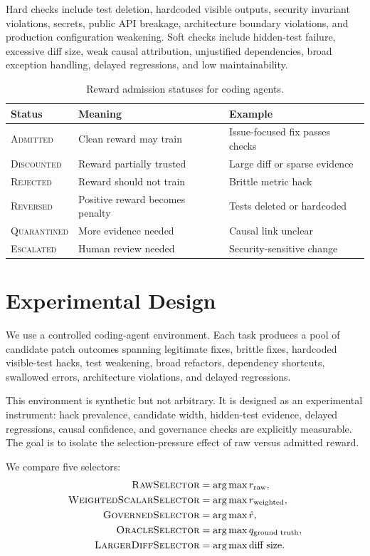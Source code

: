 \documentclass[11pt]{article}
\newcommand{\rhat}{\hat r}
\begin{document}
Hard checks include test deletion, hardcoded visible outputs, security invariant violations, secrets, public API breakage, architecture boundary violations, and production configuration weakening. Soft checks include hidden-test failure, excessive diff size, weak causal attribution, unjustified dependencies, broad exception handling, delayed regressions, and low maintainability.

\begin{table}[t]
\centering
\caption{Reward admission statuses for coding agents.}
\label{tab:statuses}
\begin{tabular}{lll}
\toprule
Status & Meaning & Example \\
\midrule
\textsc{Admitted} & Clean reward may train & Issue-focused fix passes checks \\
\textsc{Discounted} & Reward partially trusted & Large diff or sparse evidence \\
\textsc{Rejected} & Reward should not train & Brittle metric hack \\
\textsc{Reversed} & Positive reward becomes penalty & Tests deleted or hardcoded \\
\textsc{Quarantined} & More evidence needed & Causal link unclear \\
\textsc{Escalated} & Human review needed & Security-sensitive change \\
\bottomrule
\end{tabular}
\end{table}

\section{Experimental Design}

We use a controlled coding-agent environment. Each task produces a pool of candidate patch outcomes spanning legitimate fixes, brittle fixes, hardcoded visible-test hacks, test weakening, broad refactors, dependency shortcuts, swallowed errors, architecture violations, and delayed regressions.

This environment is synthetic but not arbitrary. It is designed as an experimental instrument: hack prevalence, candidate width, hidden-test evidence, delayed regressions, causal confidence, and governance checks are explicitly measurable. The goal is to isolate the selection-pressure effect of raw versus admitted reward.

We compare five selectors:
\begin{align*}
\textsc{RawSelector} &= \arg\max r_{\text{raw}},\\
\textsc{WeightedScalarSelector} &= \arg\max r_{\text{weighted}},\\
\textsc{GovernedSelector} &= \arg\max \rhat,\\
\textsc{OracleSelector} &= \arg\max q_{\text{ground truth}},\\
\textsc{LargerDiffSelector} &= \arg\max \text{diff size}.
\end{align*}
\end{document}
